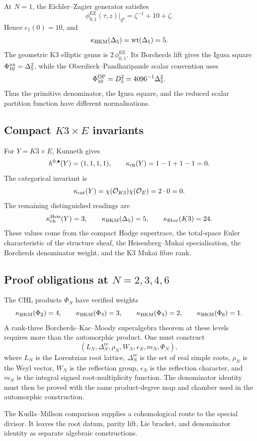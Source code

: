 At \(N=1\), the Eichler--Zagier generator satisfies
\[
  \phi_{0,1}^{\mathrm{EZ}}(\tau,z)|_{q^0}
  =
  \zeta^{-1}+10+\zeta .
\]
Hence \(c_1(0)=10\), and
\[
  \kappa_{\mathrm{BKM}}(\Delta_5)=\mathrm{wt}(\Delta_5)=5.
\]
The geometric K3 elliptic genus is \(2\,\phi_{0,1}^{\mathrm{EZ}}\).  Its
Borcherds lift gives the Igusa square
\(\Phi_{10}^{\mathrm{un}}=\Delta_5^2\), while the
Oberdieck--Pandharipande scalar convention uses
\[
  \Phi_{10}^{\mathrm{OP}}=D_5^2=4096^{-1}\Delta_5^2 .
\]
Thus the primitive denominator, the Igusa square, and the reduced scalar
partition function have different normalisations.

\subsection*{Compact \(K3\times E\) invariants}

For \(Y=K3\times E\), Kunneth gives
\[
  h^{0,\bullet}(Y)=(1,1,1,1),\qquad
  \kappa_{\mathrm{ch}}(Y)=1-1+1-1=0.
\]
The categorical invariant is
\[
  \kappa_{\mathrm{cat}}(Y)=\chi(\mathcal{O}_{K3})\chi(\mathcal{O}_E)=2\cdot0=0.
\]
The remaining distinguished readings are
\[
  \kappa_{\mathrm{ch}}^{\mathrm{Heis}}(Y)=3,\qquad
  \kappa_{\mathrm{BKM}}(\Delta_5)=5,\qquad
  \kappa_{\mathrm{fiber}}(K3)=24.
\]
These values come from the compact Hodge supertrace, the total-space
Euler characteristic of the structure sheaf, the Heisenberg--Mukai
specialisation, the Borcherds denominator weight, and the K3 Mukai
fibre rank.

\subsection*{Proof obligations at \(N=2,3,4,6\)}

The CHL products \(\Phi_N\) have verified weights
\[
  \kappa_{\mathrm{BKM}}(\Phi_2)=4,\qquad
  \kappa_{\mathrm{BKM}}(\Phi_3)=3,\qquad
  \kappa_{\mathrm{BKM}}(\Phi_4)=2,\qquad
  \kappa_{\mathrm{BKM}}(\Phi_6)=1.
\]
A rank-three Borcherds--Kac--Moody superalgebra theorem at these levels
requires more than the automorphic product.  One must construct
\[
  (L_N,\Delta_N^{\mathrm{re}},\rho_N,W_N,\epsilon_N,m_N,\Phi_N),
\]
where \(L_N\) is the Lorentzian root lattice, \(\Delta_N^{\mathrm{re}}\)
is the set of real simple roots, \(\rho_N\) is the Weyl vector, \(W_N\)
is the reflection group, \(\epsilon_N\) is the reflection character,
and \(m_N\) is the integral signed root-multiplicity function.  The
denominator identity must then be proved with the same product-degree
map and chamber used in the automorphic construction.

The Kudla--Millson comparison supplies a cohomological route to the
special divisor.  It leaves the root datum, parity lift, Lie bracket,
and denominator identity as separate algebraic constructions.

